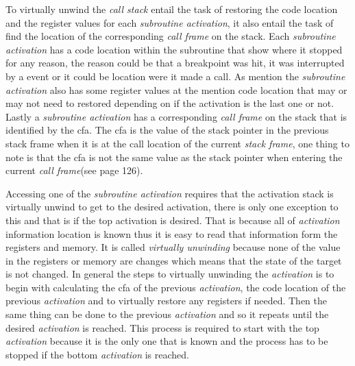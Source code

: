 


To virtually unwind the \emph{call stack} entail the task of restoring the code location and the register values for each \emph{subroutine activation}, it also entail the task of find the location of the corresponding \emph{call frame} on the stack.
Each \emph{subroutine activation} has a code location within the subroutine that show where it stopped for any reason, the reason could be that a breakpoint was hit, it was interrupted by a event or it could be location were it made a call.
As mention the \emph{subroutine activation} also has some register values at the mention code location that may or may not need to restored depending on if the activation is the last one or not.
Lastly a \emph{subroutine activation} has a corresponding \emph{call frame} on the stack that is identified by the \gls{cfa}.
The \gls{cfa} is the value of the stack pointer in the previous stack frame when it is at the call location of the current \emph{stack frame}, one thing to note is that the \gls{cfa} is not the same value as the stack pointer when entering the current \emph{call frame}(see \cite{dwarf} page 126).


Accessing one of the \emph{subroutine activation} requires that the activation stack is virtually unwind to get to the desired activation, there is only one exception to this and that is if the top activation is desired.
That is because all of \emph{activation} information location is known thus it is easy to read that information form the registers and memory. 
It is called \emph{virtually unwinding} because none of the value in the registers or memory are changes which means that the state of the target is not changed.
In general the steps to virtually unwinding the \emph{activation} is to begin with calculating the \gls{cfa} of the previous \emph{activation}, the code location of the previous \emph{activation} and to virtually restore any registers if needed.
Then the same thing can be done to the previous \emph{activation} and so it repeats until the desired \emph{activation} is reached.
This process is required to start with the top \emph{activation} because it is the only one that is known and the process has 
to be stopped if the bottom \emph{activation} is reached.


